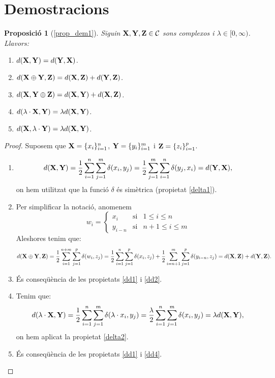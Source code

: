 \documentclass{article}
\theoremstyle{math}
\theoremstyle{TheoremNum}
\newtheorem{prop*}[definition]{Proposició}
\newcommand{\0}{\ensuremath{\vb{0}}}
\newcommand{\X}{\ensuremath{\vb{X}}}
\newcommand{\Y}{\ensuremath{\vb{Y}}}
\newcommand{\Z}{\ensuremath{\vb{Z}}}
\begin{document}
\section{Demostracions}\label{demos}
\begin{prop*}[\ref*{prop_dem1}]
  Siguin $\X,\Y,\Z\in\mathcal{C}$ sons complexos i $\lambda\in[0,\infty)$. Llavors:
  \begin{enumerate}[label=$d$\arabic*),ref=$d$\arabic*]
    \item\label{dd1} $d(\X,\Y)=d(\Y,\X)$.
    \item\label{dd2} $d(\X\oplus\Y,\Z)=d(\X,\Z)+d(\Y,\Z)$.
    \item\label{dd3} $d(\X,\Y\oplus\Z)=d(\X,\Y)+d(\X,\Z)$.
    \item\label{dd4} $d(\lambda\cdot\X,\Y)=\lambda d(\X,\Y)$.
    \item\label{dd5} $d(\X,\lambda\cdot\Y)=\lambda d(\X,\Y)$.
  \end{enumerate}
\end{prop*}
\begin{proof}
  Suposem que $\X=\{x_i\}_{i=1}^n$, $\Y=\{y_i\}_{i=1}^m$ i $\Z=\{z_i\}_{i=1}^p$.
  \begin{enumerate}[label=$d$\arabic*)]
    \item $$d(\X,\Y)=\frac{1}{2}\sum_{i=1}^n\sum_{j=1}^m\delta(x_i,y_j)=\frac{1}{2}\sum_{j=1}^m\sum_{i=1}^n\delta(y_j,x_i)=d(\Y,\X),$$ on hem utilitzat que la funció $\delta$ és simètrica (propietat \ref{delta1}).
    \item Per simplificar la notació, anomenem
          $$
            w_i=\left\{
            \begin{array}{ccc}
              x_i     & \text{si} & 1\leq i\leq n   \\
              y_{i-n} & \text{si} & n+1\leq i\leq m
            \end{array}\right.
          $$ Aleshores tenim que: $$d(\X\oplus\Y,\Z)=\frac{1}{2}\sum_{i=1}^{n+m}\sum_{j=1}^p\delta(w_i,z_j)=\frac{1}{2}\sum_{i=1}^n\sum_{j=1}^p\delta(x_i,z_j)+\frac{1}{2}\sum_{i=n+1}^m\sum_{j=1}^p\delta(y_{i-n},z_j)=d(\X,\Z)+d(\Y,\Z).$$
    \item És conseqüència de les propietats \ref{dd1} i \ref{dd2}.
    \item Tenim que: $$d(\lambda\cdot\X,\Y)=\frac{1}{2}\sum_{i=1}^n\sum_{j=1}^m\delta(\lambda\cdot x_i,y_j)=\frac{\lambda}{2}\sum_{i=1}^n\sum_{j=1}^m\delta(x_i,y_j)=\lambda d(\X,\Y),$$ on hem aplicat la propietat \ref{delta2}.
    \item És conseqüència de les propietats \ref{dd1} i \ref{dd4}.
  \end{enumerate}
\end{proof}
\end{document}
